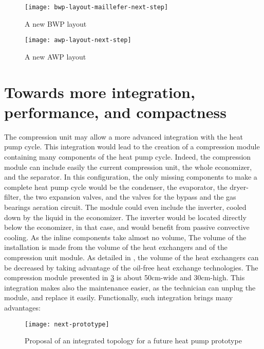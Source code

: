 \begin{figure}[htbp]
  \centering
  \texttt{[image: bwp-layout-maillefer-next-step]}
  \caption[Proposal for a new BWP layout]
  {A new BWP layout}
  \label{fig:bwp-layout-maillefer-next-step}
\end{figure}

\begin{figure}[htbp]
  \centering
  \texttt{[image: awp-layout-next-step]}
  \caption[Proposal for a new AWP layout]
  {A new AWP layout}
  \label{fig:awp-layout-next-step}
\end{figure}

\section{Towards more integration, performance,
  and compactness}
\label{sec:next-topology}

The compression unit may allow a more advanced integration with the
heat pump cycle. This integration would lead to the creation of a
compression module containing many components of the heat pump
cycle. Indeed, the compression module can include easily the current
compression unit, the whole economizer, and the separator. In this
configuration, the only missing components to make a complete heat
pump cycle would be the condenser, the evaporator, the dryer-filter,
the two expansion valves, and the valves for the bypass and the gas
bearings aeration circuit. The module could even include the inverter,
cooled down by the liquid in the economizer. The inverter would be
located directly below the economizer, in that case, and would benefit
from passive convective cooling. As the inline components take almost
no volume, The volume of the installation is made from the volume of
the heat exchangers and of the compression unit module. As detailed in
, the volume of the heat exchangers can be
decreased by taking advantage of the oil-free heat exchange
technologies. The compression module presented in
\cref{fig:next-prototype} is about 50cm-wide and 30cm-high. This
integration makes also the maintenance easier, as the technician can
unplug the module, and replace it easily. Functionally, such
integration brings many advantages:

\begin{figure}[h!tbp]
  \centering
  \texttt{[image: next-prototype]}
  \caption{Proposal of an integrated topology for a future heat pump
    prototype}
  \label{fig:next-prototype}
\end{figure}

